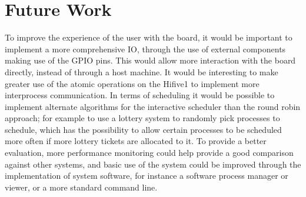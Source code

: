\section{Future Work}
To improve the experience of the user with the board, it would be important to implement a more comprehensive IO, through the use of external components making use of the GPIO pins. This would allow more interaction with the board directly, instead of through a host machine. It would be interesting to make greater use of the atomic operations on the Hifive1 to implement more interprocess communication. In terms of scheduling it would be possible to implement alternate algorithms for the interactive scheduler than the round robin approach; for example to use a lottery system to randomly pick processes to schedule, which has the possibility to allow certain processes to be scheduled more often if more lottery tickets are allocated to it. To provide a better evaluation, more performance monitoring could help provide a good comparison against other systems, and basic use of the system could be improved through the implementation of system software, for instance a software process manager or viewer, or a more standard command line.